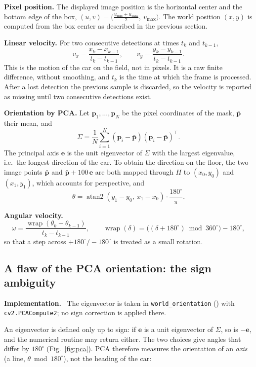 \documentclass[10pt,a4paper]{article}
\newenvironment{impl}{\par\smallskip\noindent\footnotesize\textbf{Implementation.}\ }{\par\smallskip}
\begin{document}
\textbf{Pixel position.}  The displayed image position is the horizontal
center and the bottom edge of the box,
$(u,v)=\bigl(\tfrac{u_{\min}+u_{\max}}2,\ v_{\max}\bigr)$.  The world position
$(x,y)$ is computed from the box center as described in the previous section.

\textbf{Linear velocity.}  For two consecutive detections at times $t_k$ and
$t_{k-1}$,
\[
v_x=\frac{x_k-x_{k-1}}{t_k-t_{k-1}},\qquad
v_y=\frac{y_k-y_{k-1}}{t_k-t_{k-1}} .
\]
This is the motion of the car on the field, not in pixels.  It is a raw
finite difference, without smoothing, and $t_k$ is the time at which the
frame is processed.  After a lost detection the previous sample is discarded,
so the velocity is reported as missing until two consecutive detections exist.

\textbf{Orientation by PCA.}  Let $\mathbf p_1,\dots,\mathbf p_N$ be the pixel
coordinates of the mask, $\bar{\mathbf p}$ their mean, and
\[
\Sigma=\frac1N\sum_{i=1}^{N}(\mathbf p_i-\bar{\mathbf p})(\mathbf p_i-\bar{\mathbf p})^{\!\top}.
\]
The principal axis $\mathbf e$ is the unit eigenvector of $\Sigma$ with the
largest eigenvalue, i.e.\ the longest direction of the car.  To obtain the
direction on the floor, the two image points $\bar{\mathbf p}$ and
$\bar{\mathbf p}+100\,\mathbf e$ are both mapped through $H$ to
$(x_0,y_0)$ and $(x_1,y_1)$, which accounts for perspective, and
\[
\theta=\operatorname{atan2}(y_1-y_0,\ x_1-x_0)\cdot\frac{180^\circ}{\pi}.
\]

\textbf{Angular velocity.}
\[
\omega=\frac{\operatorname{wrap}(\theta_k-\theta_{k-1})}{t_k-t_{k-1}},\qquad
\operatorname{wrap}(\delta)=\bigl((\delta+180^\circ)\bmod 360^\circ\bigr)-180^\circ,
\]
so that a step across $+180^\circ/-180^\circ$ is treated as a small rotation.

\subsection{A flaw of the PCA orientation: the sign ambiguity}
\label{sec:pca}

\begin{impl}
The eigenvector is taken in \texttt{world\_orientation}
() with \texttt{cv2.PCACompute2}; no sign correction is
applied there.
\end{impl}

An eigenvector is defined only up to sign: if $\mathbf e$ is a unit
eigenvector of $\Sigma$, so is $-\mathbf e$, and the numerical routine may
return either.  The two choices give angles that differ by $180^\circ$
(Fig.~\ref{fig:pca}).  PCA therefore measures the orientation of an
\emph{axis} (a line, $\theta \bmod 180^\circ$), not the heading of the car:
\end{document}
